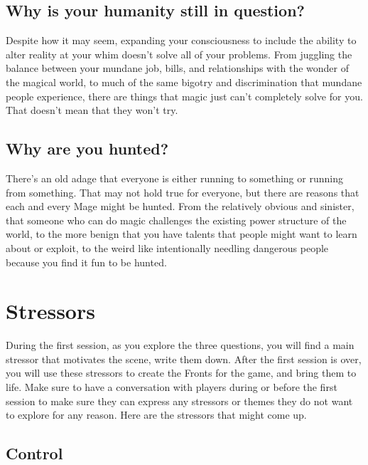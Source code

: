 \documentclass[
]{memoir}
\begin{document}
\hypertarget{why-is-your-humanity-still-in-question}{%
\subsection{Why is your humanity still in
question?}\label{why-is-your-humanity-still-in-question}}

Despite how it may seem, expanding your consciousness to include the
ability to alter reality at your whim doesn't solve all of your
problems. From juggling the balance between your mundane job, bills, and
relationships with the wonder of the magical world, to much of the same
bigotry and discrimination that mundane people experience, there are
things that magic just can't completely solve for you. That doesn't mean
that they won't try.

\hypertarget{why-are-you-hunted}{%
\subsection{Why are you hunted?}\label{why-are-you-hunted}}

There's an old adage that everyone is either running to something or
running from something. That may not hold true for everyone, but there
are reasons that each and every Mage might be hunted. From the
relatively obvious and sinister, that someone who can do magic
challenges the existing power structure of the world, to the more benign
that you have talents that people might want to learn about or exploit,
to the weird like intentionally needling dangerous people because you
find it fun to be hunted.

\hypertarget{stressors}{%
\section{Stressors}\label{stressors}}

During the first session, as you explore the three questions, you will
find a main stressor that motivates the scene, write them down. After
the first session is over, you will use these stressors to create the
Fronts for the game, and bring them to life. Make sure to have a
conversation with players during or before the first session to make
sure they can express any stressors or themes they do not want to
explore for any reason. Here are the stressors that might come up.

\hypertarget{control}{%
\subsection{Control}\label{control}}
\end{document}
